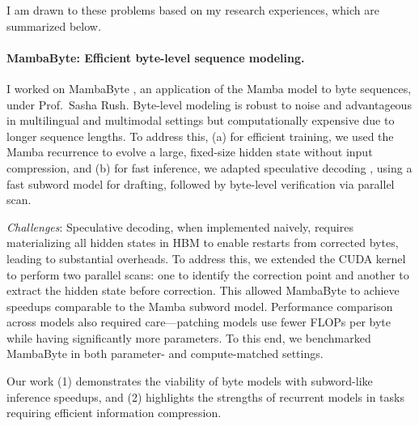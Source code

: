 
I am drawn to these problems based on my research experiences, which are summarized below.

\paragraph{MambaByte: Efficient byte-level sequence modeling.}

I worked on MambaByte \citep{wang_mambabyte_2024}, an application of the Mamba model \citep{gu_mamba_2024} to byte sequences, under Prof.~Sasha Rush.
%
Byte-level modeling is robust to noise and advantageous in multilingual and multimodal settings but computationally expensive due to longer sequence lengths.
%
To address this,
%
(a) for efficient training, we used the Mamba recurrence to evolve a large, fixed-size hidden state without input compression, and
%
(b) for fast inference, we adapted speculative decoding \citep{leviathan_fast_2023}, using a fast subword model for drafting, followed by byte-level verification via parallel scan.

\textit{Challenges}:
%
Speculative decoding, when implemented naively, requires materializing all hidden states in HBM to enable restarts from corrected bytes, leading to substantial overheads.
%
To address this, we extended the CUDA kernel to perform two parallel scans: one to identify the correction point and another to extract the hidden state before correction.
%
This allowed MambaByte to achieve speedups comparable to the Mamba subword model.
%
Performance comparison across models also required care---patching models use fewer FLOPs per byte while having significantly more parameters.
%
To this end, we benchmarked MambaByte in both parameter- and compute-matched settings.

Our work
%
(1) demonstrates the viability of byte models with subword-like inference speedups, and
%
(2) highlights the strengths of recurrent models in tasks requiring efficient information compression.

